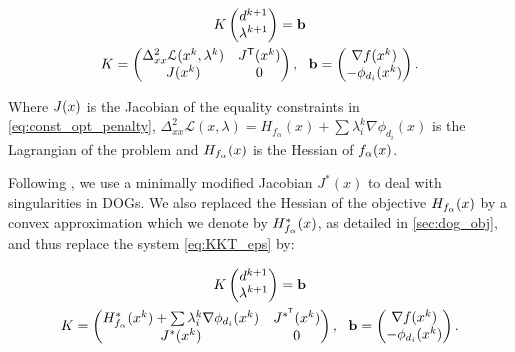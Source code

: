 \begin{equation} \label{eq:KKT_eps}
\begin{gathered}
{K} \begin{pmatrix} d^{k+1} \\ \lambda^{k+1} \end{pmatrix}=\mathbf{b} \\
{K}=\begin{pmatrix}
{\Delta^2_{xx}\mathcal{L}(x^k,\lambda^k)} & {J^\tr}(\x^k)\\
{J(\x^k)} &  0 \\
\end{pmatrix}, \ \ 
\mathbf{b}=\begin{pmatrix}
{\nabla f(x^k)} \\ 
-\phi_{d_i}(x^k)\\
\end{pmatrix}.
\end{gathered}
\end{equation}

Where $J(x)$ is the Jacobian of the equality constraints in \eqref{eq:const_opt_penalty}, $\Delta^2_{xx}\mathcal{L}(x,\lambda) = H_{f_\alpha}(x)+\sum\lambda_i^{k} \nabla \phi_{d_i}(x)$ is the Lagrangian of the problem and $H_{f_\alpha}(x)$ is the Hessian of $f_\alpha(x)$.

Following \cite{rabi2018shape}, we use a minimally modified Jacobian $J^*(x)$ to deal with singularities in DOGs. We also replaced the Hessian of the objective $H_{f_\alpha}(x)$ by a convex approximation which we denote by $H^*_{f_\alpha}(x)$, as detailed in \ref{sec:dog_obj}, and thus replace the system \eqref{eq:KKT_eps} by:

\begin{equation} \label{eq:KKT_us}
\begin{gathered}
{K} \begin{pmatrix} d^{k+1} \\ \lambda^{k+1} \end{pmatrix}=\mathbf{b} \\
{K}=\begin{pmatrix}
{ H^*_{f_\alpha}(\x^k)+\sum\lambda_i^{k} \nabla \phi_{d_i}(\x^k)} & {J^{*^\tr}(\x^k)}\\
{J^*(\x^k)} &  0 \\
\end{pmatrix}, \ \ 
\mathbf{b}=\begin{pmatrix}
{\nabla f(x^k)} \\ 
-\phi_{d_i}(x^k)\\
\end{pmatrix}.
\end{gathered}
\end{equation}


